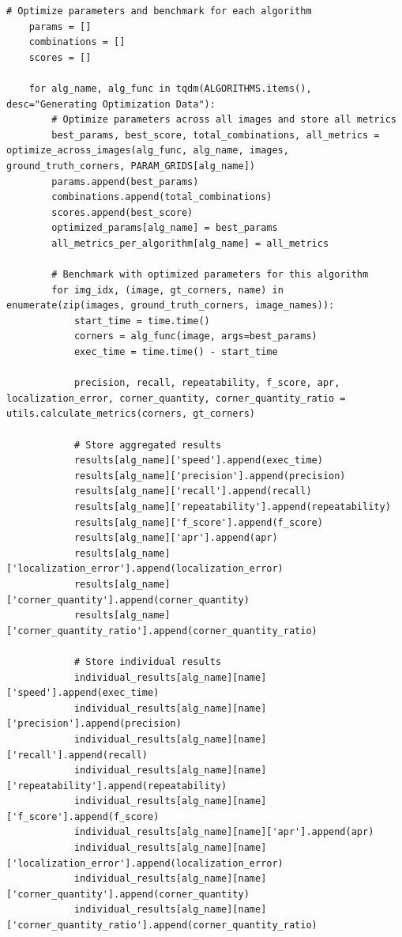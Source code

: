 \documentclass[journal]{IEEEtran}
\begin{document}
\begin{lstlisting}[style=python, caption={Driver Script for Project}, label={lst:driver}]
    # Optimize parameters and benchmark for each algorithm
    params = []
    combinations = []
    scores = []
    
    for alg_name, alg_func in tqdm(ALGORITHMS.items(), desc="Generating Optimization Data"):
        # Optimize parameters across all images and store all metrics
        best_params, best_score, total_combinations, all_metrics = optimize_across_images(alg_func, alg_name, images, ground_truth_corners, PARAM_GRIDS[alg_name])
        params.append(best_params)
        combinations.append(total_combinations)
        scores.append(best_score)
        optimized_params[alg_name] = best_params
        all_metrics_per_algorithm[alg_name] = all_metrics
        
        # Benchmark with optimized parameters for this algorithm
        for img_idx, (image, gt_corners, name) in enumerate(zip(images, ground_truth_corners, image_names)):
            start_time = time.time()
            corners = alg_func(image, args=best_params)
            exec_time = time.time() - start_time
            
            precision, recall, repeatability, f_score, apr, localization_error, corner_quantity, corner_quantity_ratio = utils.calculate_metrics(corners, gt_corners)
            
            # Store aggregated results
            results[alg_name]['speed'].append(exec_time)
            results[alg_name]['precision'].append(precision)
            results[alg_name]['recall'].append(recall)
            results[alg_name]['repeatability'].append(repeatability)
            results[alg_name]['f_score'].append(f_score)
            results[alg_name]['apr'].append(apr)
            results[alg_name]['localization_error'].append(localization_error)
            results[alg_name]['corner_quantity'].append(corner_quantity)
            results[alg_name]['corner_quantity_ratio'].append(corner_quantity_ratio)
            
            # Store individual results
            individual_results[alg_name][name]['speed'].append(exec_time)
            individual_results[alg_name][name]['precision'].append(precision)
            individual_results[alg_name][name]['recall'].append(recall)
            individual_results[alg_name][name]['repeatability'].append(repeatability)
            individual_results[alg_name][name]['f_score'].append(f_score)
            individual_results[alg_name][name]['apr'].append(apr)
            individual_results[alg_name][name]['localization_error'].append(localization_error)
            individual_results[alg_name][name]['corner_quantity'].append(corner_quantity)
            individual_results[alg_name][name]['corner_quantity_ratio'].append(corner_quantity_ratio)
    

\end{lstlisting}
\end{document}
